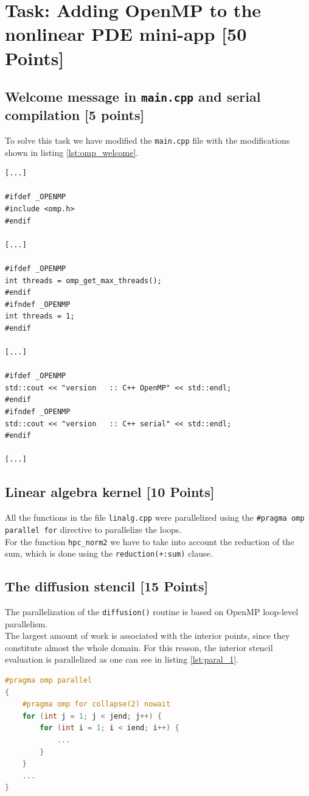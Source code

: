 \documentclass[unicode,10pt,a4paper,oneside,numbers=endperiod,openany]{scrartcl}
\begin{document}
\newpage
\section{Task: Adding OpenMP to the nonlinear PDE mini-app [50 Points]}
\subsection{Welcome message in \texttt{main.cpp} and serial compilation [5 points]}
To solve this task we have modified the \texttt{main.cpp} file with the modifications shown in listing \ref{lst:omp_welcome}.
\begin{lstlisting}[style=grayverbatim, label={lst:omp_welcome}, caption={Modifications to the welcome message in \texttt{main.cpp} to support OpenMP}]
[...]

#ifdef _OPENMP
#include <omp.h>
#endif

[...]

#ifdef _OPENMP
int threads = omp_get_max_threads(); 
#endif
#ifndef _OPENMP
int threads = 1;
#endif

[...]

#ifdef _OPENMP
std::cout << "version   :: C++ OpenMP" << std::endl;
#endif
#ifndef _OPENMP
std::cout << "version   :: C++ serial" << std::endl;
#endif

[...]
\end{lstlisting}
\subsection{Linear algebra kernel [10 Points]}
All the functions in the file \texttt{linalg.cpp} were parallelized using the \texttt{\#pragma omp parallel for} directive to parallelize the loops.\\
For the function \texttt{hpc\_norm2} we have to take into account the reduction of the sum, which is done using the \texttt{reduction(+:sum)} clause.\\
\subsection{The diffusion stencil [15 Points]}
The parallelization of the \texttt{diffusion()} routine is based on OpenMP loop-level parallelism.\\  
The largest amount of work is associated with the interior points, since they constitute almost the whole domain.  
For this reason, the interior stencil evaluation is parallelized as one can see in listing \ref{lst:paral_1}.
\begin{lstlisting}[language=C++,style=grayverbatim,label=lst:paral_1,caption=Interior grid points parallelization]
#pragma omp parallel
{
    #pragma omp for collapse(2) nowait
    for (int j = 1; j < jend; j++) {
        for (int i = 1; i < iend; i++) {
            ...
        }
    }
    ...
}
\end{lstlisting}
\end{document}
